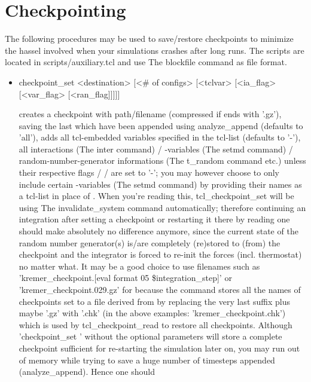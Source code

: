 \section{Checkpointing}
The following procedures may be used to save/restore checkpoints to
minimize the hassel involved when your simulations crashes after long
runs. The scripts are located in scripts/auxiliary.tcl and use The
blockfile command as file format.
\begin{itemize}
 \item
\begin{code}
checkpoint\_set <destination> [<\# of configs> [<tclvar>
 [<ia\_flag> [<var\_flag> [<ran\_flag]]]]]
\end{code}
creates a checkpoint with path/filename  (compressed
if  ends with '.gz'), saving the last  which have been appended using analyze\_append (defaults to
'all'), adds all tcl-embedded variables specified in the tcl-list
 (defaults to '-'), all interactions (The inter command) /
\es{}-variables (The setmd command) / random-number-generator
informations (The t\_random command etc.) unless their respective
flags  /  /  are set to
'-'; you may however choose to only include certain \es{}-variables
(The setmd command) by providing their names as a tcl-list in place of
.  When you're reading this, tcl\_checkpoint\_set will
be using The invalidate\_system command automatically; therefore
continuing an integration after setting a checkpoint or restarting it
there by reading one should make absolutely no difference anymore,
since the current state of the random number generator(s) is/are
completely (re)stored to (from) the checkpoint and the integrator is
forced to re-init the forces (incl. thermostat) no matter what.  It
may be a good choice to use filenames such as
'kremer\_checkpoint.[eval format 05 \$integration\_step]' or
'kremer\_checkpoint.029.gz' for  because the command
stores all the names of checkpoints set to a file derived from
 by replacing the very last suffix plus maybe '.gz'
with '.chk' (in the above examples: 'kremer\_checkpoint.chk') which is
used by tcl\_checkpoint\_read to restore all checkpoints.  Although
'checkpoint\_set ' without the optional parameters
will store a complete checkpoint sufficient for re-starting the
simulation later on, you may run out of memory while trying to save a
huge number of timesteps appended (analyze\_append). Hence one should

\end{itemize}

